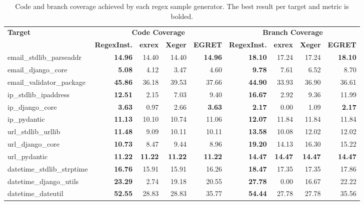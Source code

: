 \begin{table}[t]
\centering
\caption{Code and branch coverage achieved by each regex sample generator. The best result per target and metric is bolded.}
\label{tab:regex-function-coverage}
\small
\begin{tabular}{lrrrrrrrr}
\toprule
\textbf{Target} &
\multicolumn{4}{c}{\textbf{Code Coverage}} &
\multicolumn{4}{c}{\textbf{Branch Coverage}} \\
\cmidrule(lr){2-5}\cmidrule(lr){6-9}
& \textbf{RegexInst.} & \textbf{exrex} & \textbf{Xeger} & \textbf{EGRET} & \textbf{RegexInst.} & \textbf{exrex} & \textbf{Xeger} & \textbf{EGRET} \\
\midrule
email\_stdlib\_parseaddr & \textbf{14.96} & 14.40 & 14.40 & \textbf{14.96} & \textbf{18.10} & 17.24 & 17.24 & \textbf{18.10} \\
email\_django\_core & \textbf{5.08} & 4.12 & 3.47 & 4.60 & \textbf{9.78} & 7.61 & 6.52 & 8.70 \\
email\_validator\_package & \textbf{45.86} & 36.18 & 39.53 & 37.66 & \textbf{44.90} & 33.93 & 36.90 & 36.61 \\
ip\_stdlib\_ipaddress & \textbf{12.51} & 2.15 & 7.03 & 9.40 & \textbf{16.67} & 2.92 & 9.36 & 11.99 \\
ip\_django\_core & \textbf{3.63} & 0.97 & 2.66 & \textbf{3.63} & \textbf{2.17} & 0.00 & 1.09 & \textbf{2.17} \\
ip\_pydantic & \textbf{11.13} & 10.10 & 10.74 & 11.06 & \textbf{12.07} & 11.84 & 11.84 & 11.84 \\
url\_stdlib\_urllib & \textbf{11.48} & 9.09 & 10.11 & 10.11 & \textbf{13.58} & 10.08 & 12.02 & 12.02 \\
url\_django\_core & \textbf{10.73} & 8.47 & 9.44 & 8.96 & \textbf{19.20} & 14.13 & 16.30 & 15.22 \\
url\_pydantic & \textbf{11.22} & \textbf{11.22} & \textbf{11.22} & \textbf{11.22} & \textbf{14.47} & \textbf{14.47} & \textbf{14.47} & \textbf{14.47} \\
datetime\_stdlib\_strptime & \textbf{16.76} & 15.91 & 15.91 & 16.26 & \textbf{18.47} & 17.35 & 17.35 & 17.86 \\
datetime\_django\_utils & \textbf{23.29} & 2.74 & 19.18 & 20.55 & \textbf{27.78} & 0.00 & 16.67 & 22.22 \\
datetime\_dateutil & \textbf{52.55} & 28.83 & 28.83 & 35.77 & \textbf{54.44} & 27.78 & 27.78 & 35.56 \\

\end{tabular}
\end{table}
